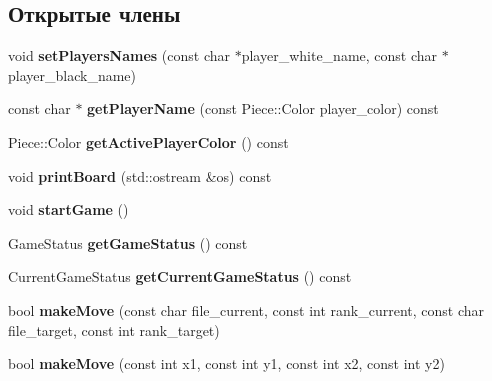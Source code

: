 \subsection*{Открытые члены}
\begin{DoxyCompactItemize}
\item 
\mbox{\label{class_chess_1_1_game_aec4cf66335f57f6a5f655b750e57e0fa}} 
void {\bfseries set\+Players\+Names} (const char $\ast$player\+\_\+white\+\_\+name, const char $\ast$player\+\_\+black\+\_\+name)
\item 
\mbox{\label{class_chess_1_1_game_a4efb0d8ba450f51a480afc1e191cc66a}} 
const char $\ast$ {\bfseries get\+Player\+Name} (const Piece\+::\+Color player\+\_\+color) const
\item 
\mbox{\label{class_chess_1_1_game_a8cab7920c359cf67801ac3fd587fa3d7}} 
Piece\+::\+Color {\bfseries get\+Active\+Player\+Color} () const
\item 
\mbox{\label{class_chess_1_1_game_a89c89d64fc10d4fd559491f9de98a8a9}} 
void {\bfseries print\+Board} (std\+::ostream \&os) const
\item 
\mbox{\label{class_chess_1_1_game_ae8638ccdb0ef3bf39a6affa30aa1258f}} 
void {\bfseries start\+Game} ()
\item 
\mbox{\label{class_chess_1_1_game_a46f78f45e092de4878600e290640d38b}} 
Game\+Status {\bfseries get\+Game\+Status} () const
\item 
\mbox{\label{class_chess_1_1_game_a5403d6708175f73d8249990f4cdb91eb}} 
Current\+Game\+Status {\bfseries get\+Current\+Game\+Status} () const
\item 
\mbox{\label{class_chess_1_1_game_af8d2110ad5a08a88cab48c52be58fe42}} 
bool {\bfseries make\+Move} (const char file\+\_\+current, const int rank\+\_\+current, const char file\+\_\+target, const int rank\+\_\+target)
\item 
\mbox{\label{class_chess_1_1_game_aae5ab8b7d4591c466abd8d53f453415b}} 
bool {\bfseries make\+Move} (const int x1, const int y1, const int x2, const int y2)

\end{DoxyCompactItemize}
